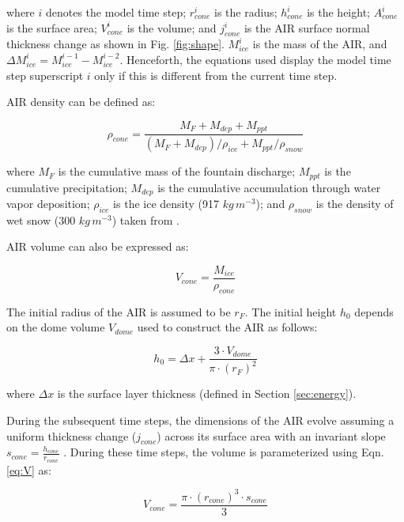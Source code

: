 where $i$ denotes the model time step; $r_{cone}^i$ is the radius; $h_{cone}^i$ is the height; $A_{cone}^i$ is
the surface area; $V_{cone}^i$ is the volume; and $j_{cone}^i$ is the \ac{AIR} surface normal thickness change as shown
in Fig. \ref{fig:shape}. $M_{ice}^i$ is the mass of the \ac{AIR}, and $\Delta M_{ice}^i = M_{ice}^{i-1} -
	M_{ice}^{i-2}$. Henceforth, the equations used display the model time step superscript $i$ only if this is different
from the current time step.

AIR density can be defined as:

\begin{equation}
	\rho_{cone} = \frac{M_{F} + M_{dep} + M_{ppt}}{(M_{F} + M_{dep})/\rho_{ice} + M_{ppt}/\rho_{snow}}
\end{equation}

where $M_F$ is the cumulative mass of the fountain discharge; $M_{ppt}$ is the cumulative precipitation;
$M_{dep}$ is the cumulative accumulation through water vapor deposition; $\rho_{ice}$ is the ice density (917
$kg\,m^{-3}$); and $\rho_{snow}$ is the density of wet snow (300 $kg\,m^{-3}$) taken from
\cite{cuffeyPhysicsGlaciers2010}.

AIR volume can also be expressed as:

\begin{equation} V_{cone} =\frac{M_{ice}} {\rho_{cone}} \label{eq:V1} \end{equation}

The initial radius of the \ac{AIR} is assumed to be $r_F$. The initial height $h_0$ depends on the dome volume
$V_{dome}$ used to construct the \ac{AIR} as follows:

\begin{equation}
	h_{0} =  \Delta x + \frac{3 \cdot V_{dome}}{\pi \cdot (r_F)^2 }
	\label{eq:h0}
\end{equation}

where $\Delta x$ is the surface layer thickness (defined in Section \ref{sec:energy}).

During the subsequent time steps, the dimensions of the \ac{AIR} evolve assuming a uniform thickness change ($j_{cone}$)
across its surface area with an invariant slope $s_{cone} = \frac{h_{cone}}{r_{cone}}$ .  During these time
steps, the volume is parameterized using Eqn. \ref{eq:V} as:

\begin{equation} 
  V_{cone} = \frac{\pi \cdot {(r_{cone})}^3 \cdot s_{cone}}{3} 
\label{eq:V2} 
\end{equation}

